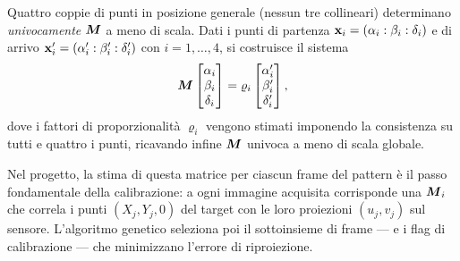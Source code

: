 \begin{defn}
Quattro coppie di punti in posizione generale (nessun tre collineari)
determinano \emph{univocamente} \(\boldsymbol{M}\) a meno di scala.
Dati i punti di partenza
\(\mathbf{x}_i=(\alpha_i:\beta_i:\delta_i)\) e di arrivo
\(\mathbf{x}'_i=(\alpha'_i:\beta'_i:\delta'_i)\)
con \(i=1,\dots,4\), si costruisce il sistema
\[
  \boldsymbol{M}
  \begin{bmatrix}\alpha_i\\\beta_i\\\delta_i\end{bmatrix}
  = \varrho_i
  \begin{bmatrix}\alpha'_i\\\beta'_i\\\delta'_i\end{bmatrix},
\]
dove i fattori di proporzionalità \(\varrho_i\) vengono stimati
imponendo la consistenza su tutti e quattro i punti, ricavando
infine \(\boldsymbol{M}\) univoca a meno di scala globale.
\end{defn}

Nel progetto, la stima di questa matrice per ciascun frame del
pattern è il passo fondamentale della calibrazione: a ogni immagine
acquisita corrisponde una \(\boldsymbol{M}_i\) che correla i punti
\((X_j,Y_j,0)\) del target con le loro proiezioni \((u_j,v_j)\)
sul sensore. L'algoritmo genetico seleziona poi il sottoinsieme di
frame --- e i flag di calibrazione --- che minimizzano l'errore di
riproiezione.

